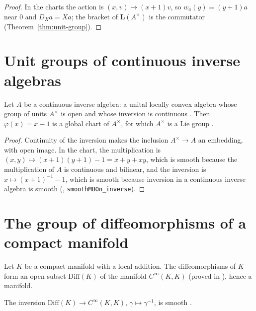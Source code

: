 \begin{proof}
  \leanok
  In the charts the action is $(x, v) \mapsto (x + 1)v$, so $w_a(y) = (y + 1)a$ near $0$ and
  $D_X a = Xa$; the bracket of $\mathbf{L}(A^\times)$ is the commutator
  (Theorem~\ref{thm:unit-group}).
\end{proof}

\section{Unit groups of continuous inverse algebras}

\begin{theorem}
  \label{thm:unit-group}
  \leanok
  Let $A$ be a continuous inverse algebra: a unital locally convex algebra whose group of units
  $A^\times$ is open and whose inversion is continuous \cite[Definition 5.1.3(a)]{GN26}. Then
  $\varphi(x) = x - 1$ is a global chart of $A^\times$, for which $A^\times$ is a Lie group
  \cite[Example 5.1.4, Example 5.1.9(b)]{GN26}.
\end{theorem}

\begin{proof}
  \leanok
  Continuity of the inversion makes the inclusion $A^\times \to A$ an embedding, with open image.
  In the chart, the multiplication is $(x, y) \mapsto (x + 1)(y + 1) - 1 = x + y + xy$, which is
  smooth because the multiplication of $A$ is continuous and bilinear, and the inversion is
  $x \mapsto (x + 1)^{-1} - 1$, which is smooth because inversion in a continuous inverse algebra
  is smooth \cite[Corollary 1.3.8]{GN26} (\cite{LCA}, \texttt{smoothMBOn\_inverse}).
\end{proof}

\section{The group of diffeomorphisms of a compact manifold}

Let $K$ be a compact manifold with a local addition. The diffeomorphisms of $K$ form an open
subset $\mathrm{Diff}(K)$ of the manifold $C^\infty(K, K)$ \cite[Proposition 13.1.10]{GN26}
(proved in \cite{LCM}), hence a manifold.

\begin{theorem}
  \label{thm:diff-inv}
  \leanok
  The inversion $\mathrm{Diff}(K) \to C^\infty(K, K)$, $\gamma \mapsto \gamma^{-1}$, is smooth
  \cite[Proposition 13.1.10(a)]{GN26}.
\end{theorem}

